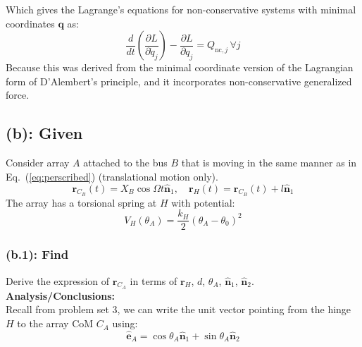 \documentclass[titlepage]{article}
\begin{document}
\begin{mdframed}[linewidth=1pt, innertopmargin=10pt, innerbottommargin=10pt]
	Which gives the Lagrange's equations for non-conservative systems with minimal coordinates $\boldsymbol{q}$ as:
	\begin{equation}
		\frac{d}{dt}\left(\frac{\partial L}{\partial\dot{q}_j}\right)-\frac{\partial L}{\partial q_j}=Q_{\text{nc},j}\,\forall j
	\end{equation}
	Because this was derived from the minimal coordinate version of the Lagrangian form of D'Alembert's principle, and it incorporates non-conservative generalized force.
\end{mdframed}

\newpage

\subsection*{(b): Given}
Consider array $A$ attached to the bus $B$ that is moving in the same manner as in Eq.~(\ref{eq:perscribed}) (translational motion only).
\begin{equation}
	\boldsymbol{r}_{C_B}(t)=X_B\cos\Omega t\hat{\boldsymbol{n}}_1,\quad\boldsymbol{r}_H(t)=\boldsymbol{r}_{C_B}(t)+l\hat{\boldsymbol{n}}_1
	\label{eq:perscribed}
\end{equation}
The array has a torsional spring at $H$ with potential:
\begin{equation}
	V_H(\theta_A)=\frac{k_H}{2}\left(\theta_A-\theta_0\right)^2
	\label{eq:springpotential}
\end{equation}

\subsubsection*{(b.1): Find}
Derive the expression of $\boldsymbol{r}_{C_A}$ in terms of $\boldsymbol{r}_H$, $d$, $\theta_A$, $\hat{\boldsymbol{n}}_1$, $\hat{\boldsymbol{n}}_2$.\\

\textbf{Analysis/Conclusions:}\\
Recall from problem set 3, we can write the unit vector pointing from the hinge $H$ to the array CoM $C_A$ using:
\begin{equation}
	\hat{\boldsymbol{e}}_A=\cos\theta_A\hat{\boldsymbol{n}}_1+\sin\theta_A\hat{\boldsymbol{n}}_2
\end{equation}
\end{document}
